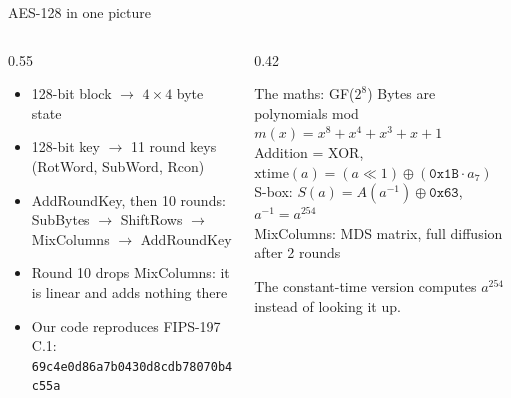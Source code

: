 \documentclass[aspectratio=169,11pt]{beamer}
\newcommand{\code}[1]{\texttt{#1}}
\begin{document}
\begin{frame}{AES-128 in one picture}
\begin{columns}[T]
\begin{column}{0.55\textwidth}
\begin{itemize}
  \item 128-bit block $\rightarrow$ $4\times4$ byte \alert{state}
  \item 128-bit key $\rightarrow$ \alert{11 round keys} (RotWord, SubWord, Rcon)
  \item AddRoundKey, then 10 rounds:\\ SubBytes $\rightarrow$ ShiftRows $\rightarrow$ MixColumns $\rightarrow$ AddRoundKey
  \item Round 10 drops MixColumns: it is linear and adds nothing there
  \item Our code reproduces FIPS-197 C.1:\\ {\footnotesize\code{69c4e0d86a7b0430d8cdb78070b4c55a}}
\end{itemize}
\end{column}
\begin{column}{0.42\textwidth}
\begin{block}{The maths: GF($2^8$)}
\small
Bytes are polynomials mod $m(x) = x^8+x^4+x^3+x+1$\\[3pt]
Addition = XOR, $\mathrm{xtime}(a) = (a\ll1)\oplus(\texttt{0x1B}\cdot a_7)$\\[3pt]
S-box: $S(a) = A(a^{-1})\oplus\texttt{0x63}$, \quad $a^{-1} = a^{254}$\\[3pt]
MixColumns: MDS matrix, full diffusion after 2 rounds
\end{block}
\small The constant-time version \alert{computes} $a^{254}$ instead of looking it up.
\end{column}
\end{columns}
\end{frame}
\end{document}
